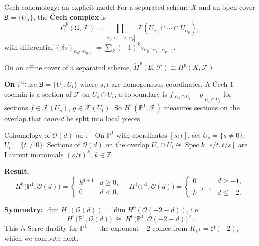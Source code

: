 \documentclass[aspectratio=169,12pt]{beamer}
\newenvironment{mathbox}{%
  \begin{tcolorbox}[mathbox]}{%
  \end{tcolorbox}}
\begin{document}
\begin{frame}{\v{C}ech cohomology: an explicit model}
  For a separated scheme $X$ and an open cover
  $\mathfrak{U} = \{U_\alpha\}$, the \textbf{\v{C}ech complex} is
  \[
    \check{C}^p(\mathfrak{U}, \mathcal{F})
    = \prod_{|\alpha_0 < \cdots < \alpha_p|}
      \mathcal{F}(U_{\alpha_0} \cap \cdots \cap U_{\alpha_p}),
  \]
  with differential $(\delta s)_{\alpha_0\cdots\alpha_{p+1}}
  = \sum_{k}(-1)^k s_{\alpha_0\cdots\hat\alpha_k\cdots\alpha_{p+1}}$.

  \medskip

  \begin{mathbox}
    On an affine cover of a separated scheme,
    $\check{H}^p(\mathfrak{U}, \mathcal{F}) \cong H^p(X, \mathcal{F})$.
  \end{mathbox}

  \medskip

  \textbf{On $\mathbb{P}^1$:}\enspace use $\mathfrak{U} = \{U_s, U_t\}$
  where $s, t$ are homogeneous coordinates.
  A \v{C}ech 1-cochain is a section of $\mathcal{F}$ on $U_s \cap U_t$;
  a coboundary is $f|_{U_s \cap U_t} - g|_{U_s \cap U_t}$
  for sections $f \in \mathcal{F}(U_s)$, $g \in \mathcal{F}(U_t)$.
  So $H^1(\mathbb{P}^1, \mathcal{F})$ measures sections on the overlap
  that \emph{cannot} be split into local pieces.
\end{frame}

\begin{frame}{Cohomology of $\mathcal{O}(d)$ on $\mathbb{P}^1$}
  On $\mathbb{P}^1$ with coordinates $[s:t]$, set
  $U_s = \{s \neq 0\}$, $U_t = \{t \neq 0\}$.
  Sections of $\mathcal{O}(d)$ on the overlap
  $U_s \cap U_t \cong \operatorname{Spec} k[s/t, t/s]$
  are Laurent monomials $(s/t)^k$, $k \in \mathbb{Z}$.

  \medskip

  \textbf{Result.}\enspace
  \[
    H^0\!\bigl(\mathbb{P}^1,\mathcal{O}(d)\bigr)
    = \begin{cases}
        k^{d+1} & d \ge 0, \\
        0        & d < 0,
      \end{cases}
    \quad
    H^1\!\bigl(\mathbb{P}^1,\mathcal{O}(d)\bigr)
    = \begin{cases}
        0          & d \ge -1, \\
        k^{-d-1}  & d \le -2.
      \end{cases}
  \]

  \textbf{Symmetry:}\enspace
  $\dim H^1(\mathcal{O}(d)) = \dim H^0(\mathcal{O}(-2-d))$,
  i.e.\
  \[
    H^1\!\bigl(\mathbb{P}^1, \mathcal{O}(d)\bigr)
    \;\cong\;
    H^0\!\bigl(\mathbb{P}^1, \mathcal{O}(-2-d)\bigr)^\vee.
  \]
  This \emph{is} Serre duality for $\mathbb{P}^1$ —
  the exponent $-2$ comes from $K_{\mathbb{P}^1} = \mathcal{O}(-2)$,
  which we compute next.
\end{frame}
\end{document}
